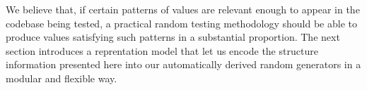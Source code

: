 We believe that, if certain patterns of values are relevant enough to appear in
the codebase being tested, a practical random testing methodology should be able
to produce values satisfying such patterns in a substantial proportion.
%
The next section introduces a reprentation model that let us encode the
structure information presented here into our automatically derived random
generators in a modular and flexible way.







